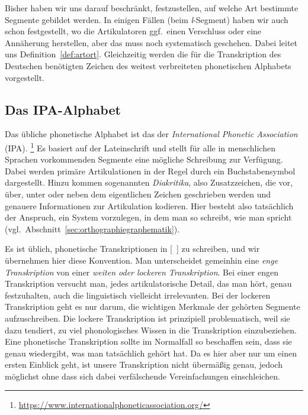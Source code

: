 \label{sec:artikulationsort}

Bisher haben wir uns darauf beschränkt, festzustellen, auf welche Art bestimmte Segmente gebildet werden.
In einigen Fällen (\zB beim \textit{l}-Segment) haben wir auch schon festgestellt, wo die Artikulatoren ggf.\ einen Verschluss oder eine Annäherung herstellen, aber das muss noch systematisch geschehen.
Dabei leitet uns Definition~\ref{def:artort}.
Gleichzeitig werden die für die Transkription des Deutschen benötigten Zeichen des weitest verbreiteten phonetischen Alphabets vorgestellt.


\subsection{Das IPA-Alphabet}

\label{sec:ipaalphabet}

Das übliche phonetische Alphabet ist das der \textit{International Phonetic Association} (IPA).%
\footnote{\url{https://www.internationalphoneticassociation.org/}}	
Es basiert auf der Lateinschrift und stellt für alle in menschlichen Sprachen vorkommenden Segmente eine mögliche Schreibung zur Verfügung.
Dabei werden primäre Artikulationen in der Regel durch ein Buchstabensymbol dargestellt.
Hinzu kommen sogenannten \textit{Diakritika}, also Zusatzzeichen, die vor, über, unter oder neben dem eigentlichen Zeichen geschrieben werden und genauere Informationen zur Artikulation kodieren.
Hier besteht also tatsächlich der Anspruch, ein System vorzulegen, in dem man so schreibt, wie man spricht (vgl.\ Abschnitt~\ref{sec:orthographiegraphematik}).

Es ist üblich, phonetische Transkriptionen in [~] zu schreiben, und wir übernehmen hier diese Konvention.
Man unterscheidet gemeinhin eine \textit{enge Transkription} von einer \textit{weiten oder lockeren Transkription}.
Bei einer engen Transkription versucht man, jedes artikulatorische Detail, das man hört, genau festzuhalten, auch die linguistisch vielleicht irrelevanten.
Bei der lockeren Transkription geht es nur darum, die wichtigen Merkmale der gehörten Segmente aufzuschreiben.
Die lockere Transkription ist prinzipiell problematisch, weil sie dazu tendiert, zu viel phonologisches Wissen in die Transkription einzubeziehen.
Eine phonetische Transkription sollte im Normalfall so beschaffen sein, dass sie genau wiedergibt, was man tatsächlich gehört hat.
Da es hier aber nur um einen ersten Einblick geht, ist unsere Transkription nicht übermäßig genau, jedoch möglichst ohne dass sich dabei verfälschende Vereinfachungen einschleichen.

